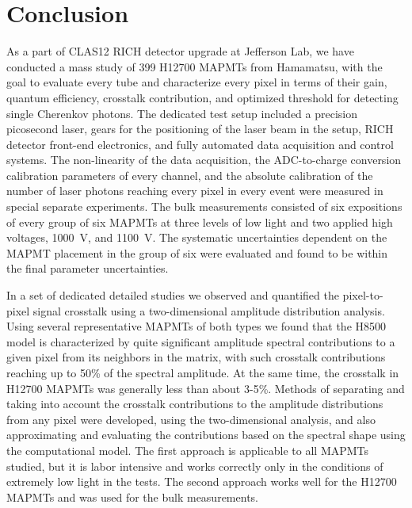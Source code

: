 \section{Conclusion}

As a part of CLAS12 RICH detector upgrade at Jefferson Lab, we have conducted a mass study of 399 H12700 MAPMTs from Hamamatsu, with the goal to evaluate every tube and characterize every pixel in terms of their gain, quantum efficiency, crosstalk contribution, and optimized threshold for detecting single Cherenkov photons. The dedicated test setup included a precision picosecond laser, 
gears for the  positioning of the laser beam in the setup,
RICH detector front-end electronics, and fully automated data acquisition and control systems. The non-linearity of the data acquisition, the ADC-to-charge conversion calibration parameters of every channel, and the absolute calibration of the number of laser photons reaching every pixel in every event were measured in special separate experiments. The bulk measurements consisted of six expositions of every group of six MAPMTs at three levels of low light and two applied high voltages, 1000~V, and 1100~V. The systematic uncertainties dependent on the MAPMT placement in the group of six were evaluated and found to be within the final parameter uncertainties.

In a set of dedicated detailed studies we observed and quantified the pixel-to-pixel signal crosstalk using a two-dimensional amplitude distribution analysis. Using several representative MAPMTs of both types we found that the H8500 model is characterized by quite significant amplitude spectral contributions to a given pixel from its neighbors in the matrix, with such crosstalk contributions reaching up to 50\% of the spectral amplitude. At the same time, the crosstalk in H12700 MAPMTs was generally less than about 3-5\%. Methods of separating and taking into account the crosstalk contributions to the amplitude distributions from any pixel were developed, using the two-dimensional analysis, and also approximating and evaluating the contributions based on the spectral shape using the computational model. The first approach is applicable to all MAPMTs studied, but it is labor intensive and works correctly only in the conditions of extremely low light in the tests. The second approach works well for the H12700 MAPMTs and was used for the bulk measurements.

